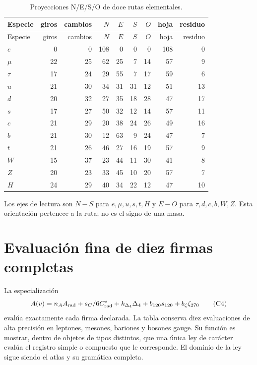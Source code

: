 \begin{longtable}{@{}lrrrrrrrr@{}}
\caption{Proyecciones N/E/S/O de doce rutas elementales.}
\label{tab:doce-huellas-ruta-rev6}\\
\toprule
Especie&giros&cambios&\(N\)&\(E\)&\(S\)&\(O\)&hoja&residuo\\
\midrule
\endfirsthead
\toprule
Especie&giros&cambios&\(N\)&\(E\)&\(S\)&\(O\)&hoja&residuo\\
\midrule
\endhead
\(e\)&0&0&108&0&0&0&108&0\\
\(\mu\)&22&25&62&25&7&14&57&9\\
\(\tau\)&17&24&29&55&7&17&59&6\\
\(u\)&21&30&34&31&31&12&51&13\\
\(d\)&20&32&27&35&18&28&47&17\\
\(s\)&17&27&50&32&12&14&57&11\\
\(c\)&21&29&20&38&24&26&49&16\\
\(b\)&21&30&12&63&9&24&47&7\\
\(t\)&21&26&46&27&16&19&57&9\\
\(W\)&15&37&23&44&11&30&41&8\\
\(Z\)&20&23&33&45&10&20&57&7\\
\(H\)&24&29&40&34&22&12&47&10\\
\bottomrule
\end{longtable}

Los ejes de lectura son \(N\!-\!S\) para
\(e,\mu,u,s,t,H\) y \(E\!-\!O\) para
\(\tau,d,c,b,W,Z\). Esta orientación pertenece a la ruta; no es el signo de
una masa.

\section{Evaluación fina de diez firmas completas}

La especialización
\[
\mathcal A(v)=
n_AA_{\rm rad}
+\frac{s_C}{6}C^*_{\rm rad}
+k_{\Delta_4}\Delta_4
+b_{120}s_{120}
+b_{\zeta}\zeta_{270}
\tag{C4}\label{eq:evaluacion-fina-catalogo}
\]
evalúa exactamente cada firma declarada. La tabla conserva diez evaluaciones
de alta precisión en leptones, mesones, bariones y bosones gauge. Su función
es mostrar, dentro de objetos de tipos distintos, que una única ley de
carácter evalúa el registro simple o compuesto que le corresponde. El
dominio de la ley sigue siendo el atlas y su gramática completa.

